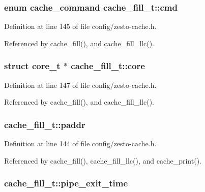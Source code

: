 \subsubsection[{cmd}]{\setlength{\rightskip}{0pt plus 5cm}enum {\bf cache\_\-command} {\bf cache\_\-fill\_\-t::cmd}}\label{structcache__fill__t_6e4ecafa894e0bb1925dc5be67023533}




Definition at line 145 of file config/zesto-cache.h.

Referenced by cache\_\-fill(), and cache\_\-fill\_\-llc().
\subsubsection[{core}]{\setlength{\rightskip}{0pt plus 5cm}struct {\bf core\_\-t} $\ast$ {\bf cache\_\-fill\_\-t::core}\hspace{0.3cm}{\tt  [read]}}\label{structcache__fill__t_cafc08d5b0dad4ed15cd6019d3623a2b}




Definition at line 147 of file config/zesto-cache.h.

Referenced by cache\_\-fill(), and cache\_\-fill\_\-llc().
\subsubsection[{paddr}]{ {\bf cache\_\-fill\_\-t::paddr}}\label{structcache__fill__t_2a93cc6ca78e629dd53a347d228f474f}




Definition at line 144 of file config/zesto-cache.h.

Referenced by cache\_\-fill(), cache\_\-fill\_\-llc(), and cache\_\-print().
\subsubsection[{pipe\_\-exit\_\-time}]{ {\bf cache\_\-fill\_\-t::pipe\_\-exit\_\-time}}\label{structcache__fill__t_15913feed40e030e1609c19cc5940a9b}




